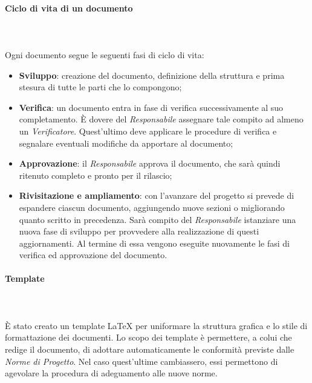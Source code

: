 \paragraph{Ciclo di vita di un documento} \mbox{} \\ \mbox{} \\
Ogni documento segue le seguenti fasi di ciclo di vita:
\begin{itemize}
\item \textbf{Sviluppo}: creazione del documento, definizione della struttura e prima stesura di tutte le parti che lo compongono;
\item \textbf{Verifica}: un documento entra in fase di verifica successivamente al suo completamento. È dovere del \textit{Responsabile} assegnare tale compito ad almeno un \textit{Verificatore}. Quest'ultimo deve applicare le procedure di verifica e segnalare eventuali modifiche da apportare al documento;
\item \textbf{Approvazione}: il \textit{Responsabile} approva il documento, che sarà quindi ritenuto completo e pronto per il rilascio;
\item \textbf{Rivisitazione e ampliamento}: con l'avanzare del progetto si prevede di espandere ciascun documento, aggiungendo nuove sezioni o migliorando quanto scritto in precedenza. Sarà compito del \textit{Responsabile} istanziare una nuova fase di sviluppo per provvedere alla realizzazione di questi aggiornamenti. Al termine di essa vengono eseguite nuovamente le fasi di verifica ed approvazione del documento.
\end{itemize}

\paragraph{Template}\mbox{} \\ \mbox{} \\
È stato creato un template \LaTeX{} per uniformare la struttura grafica e lo stile di formattazione dei documenti. Lo scopo dei template è permettere, a colui che redige il documento, di adottare automaticamente le conformità previste dalle \textit{Norme di Progetto}. Nel caso quest'ultime cambiassero, essi permettono di agevolare la procedura di adeguamento alle nuove norme.

